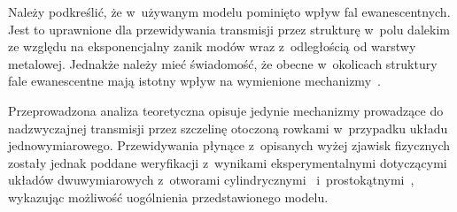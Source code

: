 Należy podkreślić, że w~używanym modelu pominięto wpływ fal ewanescentnych. Jest to uprawnione dla przewidywania transmisji przez strukturę w~polu dalekim ze względu na eksponencjalny zanik modów wraz z~odległością od warstwy metalowej. Jednakże należy mieć świadomość, że obecne w~okolicach struktury fale ewanescentne mają istotny wpływ na wymienione mechanizmy~\cite{ebbesen1998extraordinary}.

Przeprowadzona analiza teoretyczna opisuje jedynie mechanizmy prowadzące do nadzwyczajnej transmisji przez szczelinę otoczoną rowkami w~przypadku układu jednowymiarowego. Przewidywania płynące z~opisanych wyżej zjawisk fizycznych zostały jednak poddane weryfikacji z~wynikami eksperymentalnymi dotyczącymi układów dwuwymiarowych z~otworami cylindrycznymi~\cite{ebbesen1998extraordinary} i~prostokątnymi~\cite{koerkamp2004strong}, wykazując możliwość uogólnienia przedstawionego modelu.

